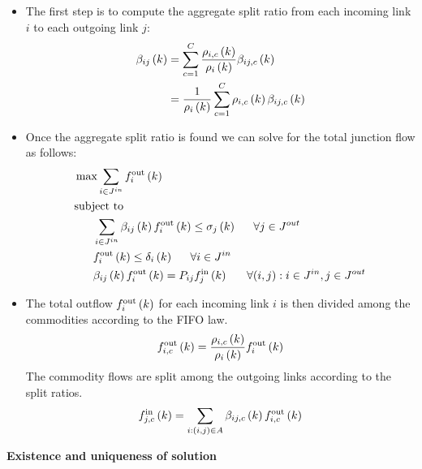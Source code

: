 \begin{itemize}
\item The first step is to compute the aggregate split ratio from each incoming link $i$ to each outgoing link $j$:
	\begin{align*}
	\aggsplitratio{i}{j}{k} &= \sum_{c=1}^C \frac{\densitymc{i}{k}{c}}{\density{i}{k}}\splitratio{i}{j}{k}{c}\\
							&=  \frac{1}{\density{i}{k}} \sum_{c=1}^C \densitymc{i}{k}{c}\splitratio{i}{j}{k}{c}
	\end{align*} 

\item Once the aggregate split ratio is found we can solve for the total junction flow as follows:
	\begin{align*}
	&\max \sum_{i \in J^{in}}\flowout{i}{k} \\
	&\text{subject to} \\
	&\ \ \ \ \ \sum_{i \in J^{in}}\aggsplitratio{i}{j}{k} \flowout{i}{k} \le{\cellsupply{j}{k}} \ \ \ \ \ \forall{j\in J^{out}}\\
	&\ \ \ \ \ \flowout{i}{k} \le{\celldemand{i}{k}} \ \ \ \ \ \forall{i\in J^{in}}\\
	&\ \ \ \ \ \aggsplitratio{i}{j}{k}\flowout{i}{k} = \prioritym{i}{j}\flowin{j}{k} \ \ \ \ \ \forall{(i,j): i\in J^{in}, j\in J^{out}}
	\end{align*}

\item The total outflow $\flowout{i}{k}$ for each incoming link $i$ is then divided among the commodities according to the FIFO law.
	\begin{align*}
	\flowoutmc{i}{k}{c} &= \frac{\densitymc{i}{k}{c}}{\density{i}{k}}\flowout{i}{k}\\
	\end{align*} 
	The commodity flows are split among the outgoing links according to the split ratios.
	\begin{align*}
	\flowinmc{j}{k}{c} &= \sum_{i:(i,j)\in A} \splitratio{i}{j}{k}{c} \flowoutmc{i}{k}{c}\\
	\end{align*} 


\end{itemize}

\textbf{Existence and uniqueness of solution}

